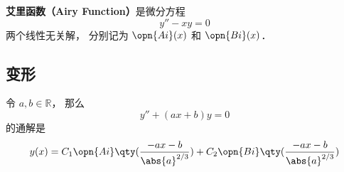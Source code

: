 
\begin{issues}
\issueDraft
\end{issues}

\textbf{艾里函数（Airy Function）}是微分方程
\begin{equation}
y'' - xy = 0
\end{equation}
两个线性无关解， 分别记为 $\opn{Ai}(x)$ 和 $\opn{Bi}(x)$．


\subsection{变形}
令 $a, b\in \mathbb R$， 那么
\begin{equation}
y'' + (ax + b) y = 0
\end{equation}
的通解是
\begin{equation}\label{AiryF_eq1}
y(x) = C_1\opn{Ai}\qty(\frac{-ax-b}{\abs{a}^{2/3}}) + C_2 \opn{Bi}\qty(\frac{-ax-b}{\abs{a}^{2/3}})
\end{equation}

